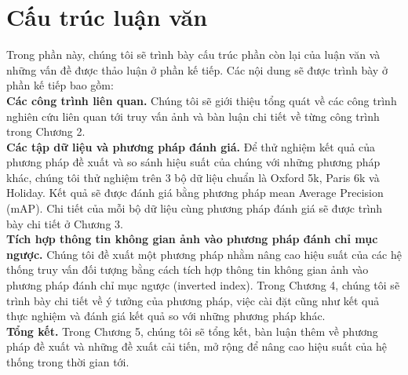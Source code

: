 \section{Cấu trúc luận văn}
Trong phần này, chúng tôi sẽ trình bày cấu trúc phần còn lại của luận văn và những vấn đề được thảo luận ở phần kế tiếp. Các nội dung sẽ được trình bày ở phần kế tiếp bao gồm:\\
 \textbf{Các công trình liên quan.} Chúng tôi sẽ giới thiệu tổng quát về các công trình nghiên cứu liên quan tới truy vấn ảnh và bàn luận chi tiết về từng công trình trong Chương 2.\\
 \textbf{Các tập dữ liệu và phương pháp đánh giá.} Để thử nghiệm kết quả của phương pháp đề xuất và so sánh hiệu suất của chúng với những phương pháp khác, chúng tôi thử nghiệm trên 3 bộ dữ liệu chuẩn là Oxford 5k, Paris 6k và Holiday. Kết quả sẽ được đánh giá bằng phương pháp mean Average Precision (mAP). Chi tiết của mỗi bộ dữ liệu cùng phương pháp đánh giá sẽ được trình bày chi tiết ở Chương 3.\\
 \textbf{Tích hợp thông tin không gian ảnh vào phương pháp đánh chỉ mục ngược.} Chúng tôi đề xuất một phương pháp nhằm nâng cao hiệu suất của các hệ thống truy vấn đối tượng bằng cách tích hợp thông tin không gian ảnh vào phương pháp đánh chỉ mục ngược (inverted index). Trong Chương 4, chúng tôi sẽ trình bày chi tiết về ý tưởng của phương pháp, việc cài đặt cũng như kết quả thực nghiệm và đánh giá kết quả so với những phương pháp khác.\\
 \textbf{Tổng kết.} Trong Chương 5, chúng tôi sẽ tổng kết, bàn luận thêm về phương pháp đề xuất và những đề xuất cải tiến, mở rộng để nâng cao hiệu suất của hệ thống trong thời gian tới.
 
